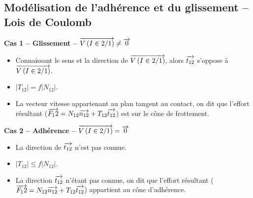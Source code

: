 \documentclass[10pt,fleqn]{article} %
\begin{document}
\subsection{Modélisation de l'adhérence et du glissement -- Lois de Coulomb}
\noindent\begin{minipage}[t]{.35\linewidth}

\begin{center}
\textbf{Cas 1 -- Glissement -- $\overrightarrow{V\left( {I} \in {2}/{1}\right)}\neq \overrightarrow{0}$}
\end{center}

\begin{itemize}
\item Connaissant le sens et la direction de $\overrightarrow{V\left( {I} \in {2}/{1}\right)}$, alors $\overrightarrow{t_{12}}$ s'oppose à $\overrightarrow{V\left( {I} \in {2}/{1}\right)}$.
\item $|T_{12}| = f |N_{12}|$.
\item La vecteur vitesse appartenant au plan tangent au contact, on dit que l'effort résultant ($\overrightarrow{F_12}=N_{12} \overrightarrow{n_{12}}+T_{12} \overrightarrow{t_{12}}$) est sur le cône de frottement. 
\end{itemize}

\end{minipage}\hfill
\begin{minipage}[t]{.35\linewidth}
\begin{center}
\textbf{Cas 2 -- Adhérence -- $\overrightarrow{V\left( {I} \in {2}/{1}\right)} = \overrightarrow{0}$}
\end{center}

\begin{itemize}
\item La direction de $\overrightarrow{t_{12}}$ n'est pas connue. 
\item $|T_{12}| \leq f |N_{12}|$.
\item La direction $\overrightarrow{t_{12}}$ n'étant pas connue, on dit que l'effort résultant ($\overrightarrow{F_12}=N_{12} \overrightarrow{n_{12}}+T_{12} \overrightarrow{t_{12}}$) appartient au cône d'adhérence. 
\end{itemize}
\end{minipage}\hfill
\end{document}

